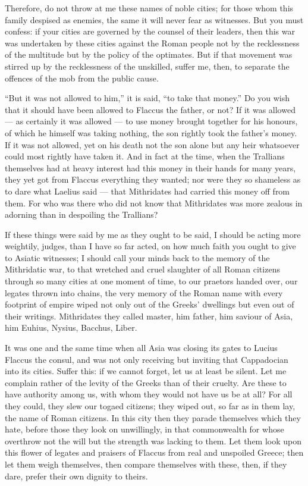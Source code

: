  Therefore, do not throw at me these names of noble cities; for those whom this family despised as enemies, the same it will never fear as witnesses. But you must confess: if your cities are governed by the counsel of their leaders, then this war was undertaken by these cities against the Roman people not by the recklessness of the multitude but by the policy of the optimates. But if that movement was stirred up by the recklessness of the unskilled, suffer me, then, to separate the offences of the mob from the public cause.

 ``But it was not allowed to him,'' it is said, ``to take that money.'' Do you wish that it should have been allowed to Flaccus the father, or not? If it was allowed --- as certainly it was allowed --- to use money brought together for his honours, of which he himself was taking nothing, the son rightly took the father's money. If it was not allowed, yet on his death not the son alone but any heir whatsoever could most rightly have taken it. And in fact at the time, when the Trallians themselves had at heavy interest had this money in their hands for many years, they yet got from Flaccus everything they wanted; nor were they so shameless as to dare what Laelius said --- that Mithridates had carried this money off from them. For who was there who did not know that Mithridates was more zealous in adorning than in despoiling the Trallians?

 If these things were said by me as they ought to be said, I should be acting more weightily, judges, than I have so far acted, on how much faith you ought to give to Asiatic witnesses; I should call your minds back to the memory of the Mithridatic war, to that wretched and cruel slaughter of all Roman citizens through so many cities at one moment of time, to our praetors handed over, our legates thrown into chains, the very memory of the Roman name with every footprint of empire wiped not only out of the Greeks' dwellings but even out of their writings. Mithridates they called master, him father, him saviour of Asia, him Euhius, Nysius, Bacchus, Liber.

 It was one and the same time when all Asia was closing its gates to Lucius Flaccus the consul, and was not only receiving but inviting that Cappadocian into its cities. Suffer this: if we cannot forget, let us at least be silent. Let me complain rather of the levity of the Greeks than of their cruelty. Are these to have authority among us, with whom they would not have us be at all? For all they could, they slew our togaed citizens; they wiped out, so far as in them lay, the name of Roman citizens. In this city then they parade themselves which they hate, before those they look on unwillingly, in that commonwealth for whose overthrow not the will but the strength was lacking to them. Let them look upon this flower of legates and praisers of Flaccus from real and unspoiled Greece; then let them weigh themselves, then compare themselves with these, then, if they dare, prefer their own dignity to theirs.

